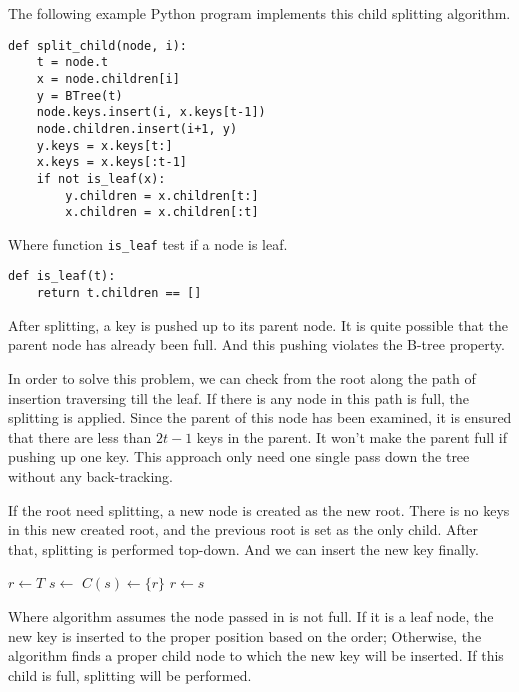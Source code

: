 \documentclass[UTF8]{article}
\begin{document}
The following example Python program implements this child splitting algorithm.

\lstset{language=Python}
\begin{lstlisting}
def split_child(node, i):
    t = node.t
    x = node.children[i]
    y = BTree(t)
    node.keys.insert(i, x.keys[t-1])
    node.children.insert(i+1, y)
    y.keys = x.keys[t:]
    x.keys = x.keys[:t-1]
    if not is_leaf(x):
        y.children = x.children[t:]
        x.children = x.children[:t]
\end{lstlisting}

Where function \texttt{is\_leaf} test if a node is leaf.

\lstset{language=Python}
\begin{lstlisting}
def is_leaf(t):
    return t.children == []
\end{lstlisting}


After splitting, a key is pushed up to its parent node.
It is quite possible that the parent node has already been full.
And this pushing violates the B-tree property.

In order to solve this problem, we can check from the root along
the path of insertion traversing till the leaf. If there is any node
in this path is full, the splitting is applied. Since the parent
of this node has been examined, it is ensured that there are
less than $2t-1$ keys in the parent. It won't make the
parent full if pushing up one key. This approach only need one single
pass down the tree without any back-tracking.

If the root need splitting, a new node is created as the new root.
There is no keys in this new created root, and the previous root is
set as the only child. After that, splitting is performed top-down.
And we can insert the new key finally.

\begin{algorithmic}[1]
  \State $r \gets T$
   
    \State $s \gets$ 
    \State $C(s) \gets \{r\}$
    \State {}
    \State $r \gets s$
  \EndIf
  \State \Return {}
\EndFunction
\end{algorithmic}

Where algorithm  assumes the node passed in
is not full. If it is a leaf node, the new key is inserted to
the proper position based on the order; Otherwise, the algorithm
finds a proper child node to which the new key will be inserted.
If this child is full, splitting will be performed.
\end{document}
